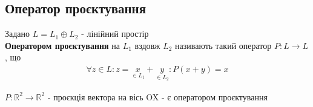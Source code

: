 \documentclass{math_library}
\begin{document}
\iffalse
\subsection{Оператор проєктування}
 Задано $L = L_1  \oplus  L_2$ - лінійний простір\\
\textbf{Оператором проєктування} на $L_1$ вздовж $L_2$ називають такий оператор $P: L \to L$, що
\begin{align*}
\forall z \in L: z = \underset{\in L_1}{x}+\underset{\in L_2}{y}: P(x+y) = x
\end{align*}

 $P: \mathbb{R}^2 \to \mathbb{R}^2$ - проєкція вектора на вісь OX - є оператором проєктування
\begin{figure}[H]
\centering
\end{figure}
\end{document}
